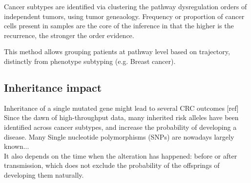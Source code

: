 Cancer subtypes are identified via clustering the pathway dysregulation orders of independent tumors, using tumor geneaology. Frequency or proportion of cancer cells present in samples are the core of the inference in that the higher is the recurrence, the stronger the order evidence.

This method allows grouping patients at pathway level based on trajectory, distinctly from phenotype subtyping (e.g. Breast cancer).


\subsection{Inheritance impact}
Inheritance of a single mutated gene might lead to several CRC outcomes [ref]
Since the dawn of high-throughput data, many inherited risk alleles have been identified across cancer subtypes, and increase the probability of developing a disease. Many Single nucleotide polymorphisms (SNPs) are nowadays largely known...
\\

It also depends on the time when the alteration has happened: before or after transmission, which does not exclude the probability of the offsprings of developing them naturally.